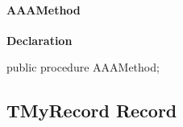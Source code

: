 \documentclass{report}
\newif\ifpdf
\begin{document}
\paragraph*{AAAMethod}\hspace*{\fill}

\label{ok_sorting.TMyClass-AAAMethod}
\begin{list}{}{
\setlength{\itemindent}{0cm}
\setlength{\listparindent}{0cm}
\setlength{\leftmargin}{\evensidemargin}
\addtolength{\leftmargin}{\tmplength}
\settowidth{\labelsep}{X}
\addtolength{\leftmargin}{\labelsep}
\setlength{\labelwidth}{\tmplength}
}
\item[\textbf{Declaration}\hfill]
\ifpdf
\begin{flushleft}
\fi
\begin{ttfamily}
public procedure AAAMethod;\end{ttfamily}

\ifpdf
\end{flushleft}
\fi

\end{list}
\ifpdf
\subsection*{\large{\textbf{TMyRecord Record}}\normalsize\hspace{1ex}\hrulefill}
\else
\subsection*{TMyRecord Record}
\fi
\label{ok_sorting.TMyRecord}
\end{document}
